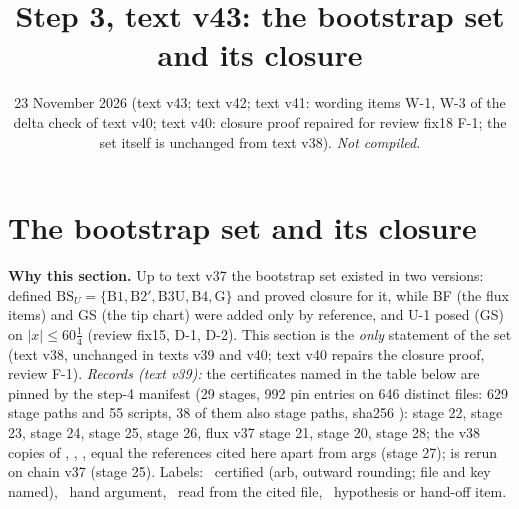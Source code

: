 \documentclass[11pt]{article}
\title{Step 3, text v43: the bootstrap set and its closure}
\author{}\date{23 November 2026 (text v43; text v42; text v41: wording items W-1, W-3 of the delta check of text v40; text v40: closure proof repaired for review fix18 F-1; the set itself is unchanged from text v38). \emph{Not compiled.}}
\begin{document}
\maketitle
\fi

\section{The bootstrap set and its closure}\label{BS:sec}
\noindent\textbf{Why this section.} Up to text v37 the bootstrap set existed in two versions:  defined $\mathrm{BS}_U=\{\mathrm{B1},\mathrm{B2}',\mathrm{B3U},\mathrm{B4},\mathrm{G}\}$ and proved closure for it, while BF (the flux items) and GS (the tip chart) were added only by reference, and U-1 posed (GS) on $|x|\le60\frac14$ (review fix15, D-1, D-2). This section is the \emph{only} statement of the set (text v38, unchanged in texts v39 and v40; text v40 repairs the closure proof, review  F-1). \emph{Records (text v39):} the certificates named in the table below are pinned by the step-4 manifest  (29 stages, 992 pin entries on 646 distinct files: 629 stage paths and 55 scripts, 38 of them also stage paths, sha256 ):  stage 22,  stage 23,  stage 24,  stage 25,  stage 26, flux v37 stage 21,  stage 20,  stage 28; the v38 copies of , , ,  equal the references cited here apart from args (stage 27);  is rerun on chain v37 (stage 25). Labels: \tC\ certified (arb, outward rounding; file and key named), \tHd\ hand argument, \tR\ read from the cited file, \tH\ hypothesis or hand-off item.
\end{document}
